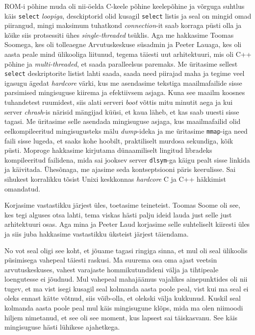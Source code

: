 ROM-i põhine muda oli nii-öelda C-keele põhine keelepõhine ja võrguga suhtlus käis \verb|select| \emph{loopiga}, desckiptorid olid kusagil \verb|select| listis ja seal on mingid omad piirangud, mingi maksimum tuhatkond \emph{connection}-it saab korraga püsti olla ja kõike siis  protsessiti ühes \emph{single-threaded} tsüklis. Aga me hakkasime Toomas Soomega, kes oli tolleaegne Arvutuskeskuse süsadmin ja Peeter Lauaga, kes oli  aasta peale mind ülikooliga liitunud, tegema täiesti uut arhitektuuri, mis oli C++ põhine ja \emph{multi-threaded}, et saada paralleelsus paremaks. Me üritasime sellest \verb|select| deskriptorite listist lahti saada, saada need piirajad maha ja tegime veel igasugu ägedat \emph{hardcore} värki, kus me asendasime tekstiga maailmafailide sisse parsimised mingisuguse kiirema ja efektiivsem asjaga. Kuna see maailm koosnes tuhandetest ruumidest, siis alati serveri \emph{boot} võttis mitu minutit aega ja kui server \emph{chrash}-is närisid mängijad küüsi, et kaua läheb, et kas saab uuesti sisse tagasi. Me üritasime selle asendada mingisuguse asjaga, kus  maailmafailid olid eelkompileeritud mingisugusteks mälu \emph{dump}-ideka ja me üritasime \verb|mmap|-iga need faili  sisse lugeda, et saaks kohe hoobilt, praktiliselt murdosa sekundiga, kõik püsti. Moproge hakkasime kirjutama dünaamiliselt lingitud libradeks kompileeritud failidena, mida sai jooksev server \verb|dlsym|-ga käigu pealt sisse linkida ja käivitada. Ühesõnaga, me ajasime seda kontseptsiooni päris keerulisse. Sai sihukest korralikku tõsist Unixi keskkonnas \emph{hardcore} C ja C++ häkkimist omandatud. 


Korjasime  vastastikku järjest üles, toetasime teineteist. Toomas Soome oli see, kes tegi alguses otsa lahti, tema viskas hästi palju ideid  lauda just selle just  arhitektuuri osas. Aga  mina ja Peeter Laud korjasime selle suhteliselt kiiresti üles ja siis juba hakkasime vastastikku üksteist järjest täiendama. 


No vot seal oligi see koht, et jõuame tagasi ringiga sinna, et mul oli seal ülikoolis püsimisega vahepeal täiesti raskusi. Ma suurema osa oma ajast veetsin arvutuskeskuses, vahest  varajaste hommikutundideni välja ja tihtipeale  loengutesse ei jõudnud. Mul vahepeal mahajäämus vajalikes ainepunktides oli nii tugev, et ma vist isegi kusagil seal kolmanda aasta poole  peal, vist kui ma seal ei oleks ennast kätte võtnud, siis võib-olla, et olekski välja kukkunud. Kuskil seal kolmanda aasta poole peal mul käis mingisugune klõps, mida ma olen niimoodi hiljem nimetanud, et see oli see moment, kus lapsest sai täiskasvanu. See käis mingisuguse hästi lühikese ajahetkega. 

